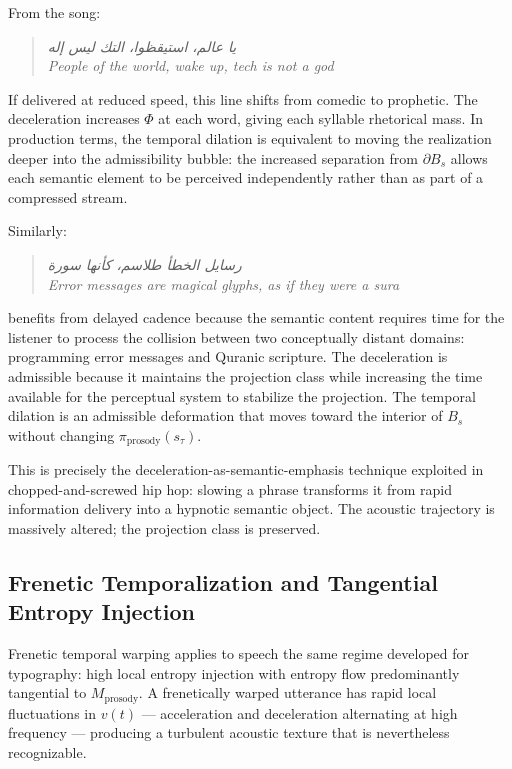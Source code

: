 \documentclass[12pt, a4paper]{article}
\theoremstyle{essaystyle}
\begin{document}
From the song:

\begin{quote}
\textit{يا عالم، استيقظوا، التك ليس إله} \\
\textit{People of the world, wake up, tech is not a god}
\end{quote}

If delivered at reduced speed, this line shifts from comedic to prophetic. The
deceleration increases $\Phi$ at each word, giving each syllable rhetorical mass.
In production terms, the temporal dilation is equivalent to moving the realization
deeper into the admissibility bubble: the increased separation from $\partial B_s$
allows each semantic element to be perceived independently rather than as part of
a compressed stream.

Similarly:

\begin{quote}
\textit{رسايل الخطأ طلاسم، كأنها سورة} \\
\textit{Error messages are magical glyphs, as if they were a sura}
\end{quote}

benefits from delayed cadence because the semantic content requires time for the
listener to process the collision between two conceptually distant domains: programming
error messages and Quranic scripture. The deceleration is admissible because it
maintains the projection class while increasing the time available for the perceptual
system to stabilize the projection. The temporal dilation is an admissible deformation
that moves toward the interior of $B_s$ without changing $\pi_{\mathrm{prosody}}(s_\tau)$.

This is precisely the deceleration-as-semantic-emphasis technique exploited in
chopped-and-screwed hip hop: slowing a phrase transforms it from rapid information
delivery into a hypnotic semantic object. The acoustic trajectory is massively altered;
the projection class is preserved.

\subsection{Frenetic Temporalization and Tangential Entropy Injection}

Frenetic temporal warping applies to speech the same regime developed for typography:
high local entropy injection with entropy flow predominantly tangential to
$M_{\mathrm{prosody}}$. A frenetically warped utterance has rapid local fluctuations
in $v(t)$ --- acceleration and deceleration alternating at high frequency --- producing
a turbulent acoustic texture that is nevertheless recognizable.
\end{document}
